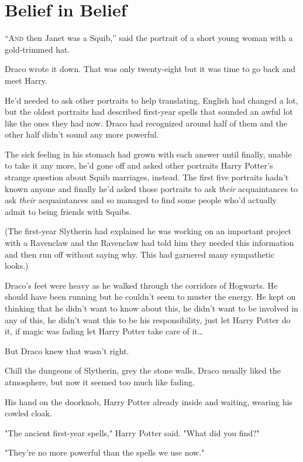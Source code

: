 \chapter{Belief in Belief}

\lettrine{“A}{nd} then Janet was a Squib,” said the portrait of a short young woman with a
gold-trimmed hat.

Draco wrote it down. That was only twenty-eight but it was time to go back and
meet Harry.

He'd needed to ask other portraits to help translating, English had changed a
lot, but the oldest portraits had described first-year spells that sounded an
awful lot like the ones they had now. Draco had recognized around half of them
and the other half didn't sound any more powerful.

The sick feeling in his stomach had grown with each answer until finally,
unable to take it any more, he'd gone off and asked other portraits Harry
Potter's strange question about Squib marriages, instead. The first five
portraits hadn't known anyone and finally he'd asked those portraits to ask
\emph{their} acquaintances to ask \emph{their} acquaintances and so managed to
find some people who'd actually admit to being friends with Squibs.

(The first-year Slytherin had explained he was working on an important project
with a Ravenclaw and the Ravenclaw had told him they needed this information
and then run off without saying why. This had garnered many sympathetic looks.)

Draco's feet were heavy as he walked through the corridors of Hogwarts. He
should have been running but he couldn't seem to muster the energy. He kept on
thinking that he didn't want to know about this, he didn't want to be involved
in any of this, he didn't want this to be his responsibility, just let Harry
Potter do it, if magic was fading let Harry Potter take care of it…

But Draco knew that wasn't right.

Chill the dungeons of Slytherin, grey the stone walls, Draco usually liked the
atmosphere, but now it seemed too much like fading.

His hand on the doorknob, Harry Potter already inside and waiting, wearing his
cowled cloak.

"The ancient first-year spells," Harry Potter said. "What did you find?"

"They're no more powerful than the spells we use now."


